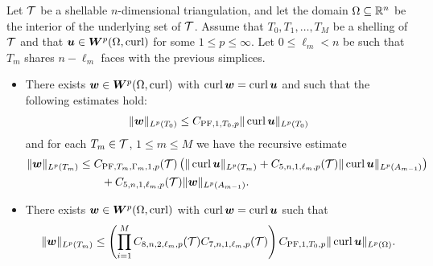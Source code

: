 \documentclass[10pt,a4paper]{article}
\begin{document}
\begin{theorem}\label{theorem:poincarefriedrichsestimate:curl}
    Let ${\mathcal T}$ be a shellable $n$-dimensional triangulation, 
    and let the domain $\Omega \subseteq {\mathbb R}^{n}$ be the interior of the underlying set of ${\mathcal T}$.
    Assume that $T_0, T_1, \dots, T_M$ be a shelling of ${\mathcal T}$ and that $\bm{u} \in \bm{W}^{p}(\Omega,\operatorname{curl})$ for some $1 \leq p \leq \infty$.
    Let $0 \leq \ell_{m} < n$ be such that $T_{m}$ shares $n - \ell_{m}$ faces with the previous simplices.
    \begin{itemize}
        \item 
        There exists $\bm{w} \in \bm{W}^{p}(\Omega,\operatorname{curl})$ with $\operatorname{curl} \bm{w} = \operatorname{curl} \bm{u}$
        and such that the following estimates hold:
        \begin{gather*}
            \| \bm{w} \|_{L^{p}(T_{0})} \leq C_{{{\rm PF}},1,T_{0},p} \| \operatorname{curl} \bm{u} \|_{L^{p}(T_{0})}
        \end{gather*}
        and for each $T_{m} \in {\mathcal T}$, $1 \leq m \leq M$ we have the recursive estimate 
        \begin{align*}
            \| \bm{w} \|_{L^{p}(T_{m})}
            &
            \leq  
            C_{{\rm PF},T_{m},\Gamma_{m},1,p}({\mathcal T}) 
            \left( 
                \| \operatorname{curl} \bm{u}      \|_{L^{p}(T_{m})} 
                +
                C_{5,n,1,\ell_{m},p}({\mathcal T})
                \| \operatorname{curl} \bm{u} \|_{L^{p}(A_{m-1})}
            \right)
            \\&\qquad
            + 
            C_{5,n,1,\ell_{m},p}({\mathcal T})
            \| \bm{w} \|_{L^{p}(A_{m-1})}
            .
        \end{align*}
        \item 
        There exists $\bm{w} \in \bm{W}^{p}(\Omega,\operatorname{curl})$ with $\operatorname{curl} \bm{w} = \operatorname{curl} \bm{u}$ 
        such that 
        \begin{align*}
            \| \bm{w} \|_{L^{p}(T_{m})}
            \leq 
            \left( 
            \prod_{i=1}^{M}
            C_{8,n,2,\ell_{m},p}({\mathcal T})
            C_{7,n,1,\ell_{m},p}({\mathcal T})
            \right)
            C_{{{\rm PF}},1,T_{0},p}
            \| \operatorname{curl} \bm{u} \|_{L^{p}(\Omega)}
            .
        \end{align*}
    \end{itemize}
\end{theorem}
\end{document}
